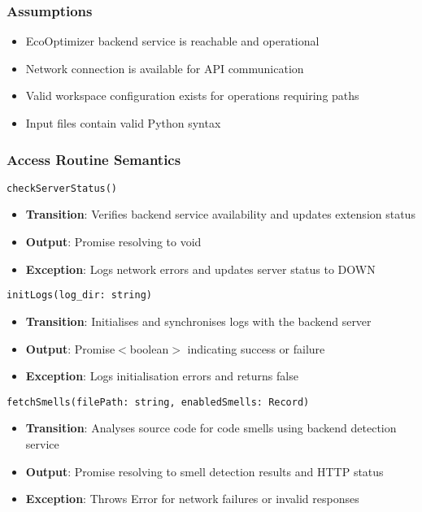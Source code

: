 \documentclass[12pt, titlepage]{article}
\begin{document}
\subsubsection{Assumptions}
\begin{itemize}
    \item EcoOptimizer backend service is reachable and operational
    \item Network connection is available for API communication
    \item Valid workspace configuration exists for operations requiring paths
    \item Input files contain valid Python syntax
\end{itemize}

\subsubsection{Access Routine Semantics}

\noindent\texttt{checkServerStatus()}
\begin{itemize}
    \item \textbf{Transition}: Verifies backend service availability and updates extension status
    \item \textbf{Output}: Promise resolving to void
    \item \textbf{Exception}: Logs network errors and updates server status to DOWN
\end{itemize}

\noindent\texttt{initLogs(log\_dir: string)}
\begin{itemize}
    \item \textbf{Transition}: Initialises and synchronises logs with the backend server
    \item \textbf{Output}: Promise$<$boolean$>$ indicating success or failure
    \item \textbf{Exception}: Logs initialisation errors and returns false
\end{itemize}

\noindent\texttt{fetchSmells(filePath: string, enabledSmells: Record)}
\begin{itemize}
    \item \textbf{Transition}: Analyses source code for code smells using backend detection service
    \item \textbf{Output}: Promise resolving to smell detection results and HTTP status
    \item \textbf{Exception}: Throws Error for network failures or invalid responses
\end{itemize}
\end{document}
